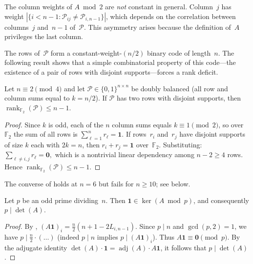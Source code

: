 \documentclass[11pt,a4paper]{article}
\newcommand{\FF}{\mathbb{F}}
\newcommand{\one}{\mathbf{1}}
\newcommand{\rank}{\operatorname{rank}}
\newcommand{\adj}{\operatorname{adj}}
\begin{document}
\begin{remark}
The column weights of $A\bmod 2$ are \emph{not} constant in general.
Column~$j$ has weight $|\{i<n-1:\mathcal{P}_{ij}\ne\mathcal{P}_{i,n-1}\}|$,
which depends on the correlation between columns~$j$ and~$n-1$
of~$\mathcal{P}$.  This asymmetry arises because the definition of~$A$
privileges the last column.
\end{remark}

The rows of~$\mathcal{P}$ form a constant-weight-$(n/2)$ binary code
of length~$n$.  The following result shows that a simple combinatorial
property of this code---the existence of a pair of rows with disjoint
supports---forces a rank deficit.

\begin{proposition}\label{prop:disjoint-pair}
Let $n\equiv 2\pmod{4}$ and let $\mathcal{P}\in\{0,1\}^{n\times n}$
be doubly balanced (all row and column sums equal to $k=n/2$).
If $\mathcal{P}$ has two rows with disjoint supports, then
$\rank_{\FF_2}(\mathcal{P})\le n-1$.
\end{proposition}

\begin{proof}
Since $k$ is odd, each of the $n$ column sums equals $k\equiv 1\pmod2$,
so over~$\FF_2$ the sum of all rows is
$\sum_{\ell=1}^{n}r_\ell=\one$.
If rows~$r_i$ and~$r_j$ have disjoint supports of size $k$ each
with $2k=n$, then $r_i+r_j=\one$ over~$\FF_2$.  Substituting:
$\sum_{\ell\ne i,j}r_\ell = \mathbf{0},$
which is a nontrivial linear dependency among $n-2\ge 4$ rows.
Hence $\rank_{\FF_2}(\mathcal{P})\le n-1$.
\end{proof}

\begin{remark}\label{rem:disjoint-n6}
The converse of  holds at $n=6$ but fails
for $n\ge 10$; see  below.
\end{remark}

\begin{theorem}\label{thm:odd-prime-kernel}
Let $p$ be an odd prime dividing~$n$.  Then
$\one\in\ker(A\bmod p)$, and consequently $p\mid\det(A)$.
\end{theorem}

\begin{proof}
By , $(A\one)_i = \frac{n}{2}(n+1-2L_{i,n-1})$.
Since $p\mid n$ and $\gcd(p,2)=1$, we have $p\mid\frac{n}{2}\cdot(\ldots)$
(indeed $p\mid n$ implies $p\mid(A\one)_i$).  Thus
$A\one\equiv\mathbf{0}\pmod{p}$.  By the adjugate identity
$\det(A)\cdot\one = \adj(A)\cdot A\one$, it follows that
$p\mid\det(A)$.
\end{proof}
\end{document}
